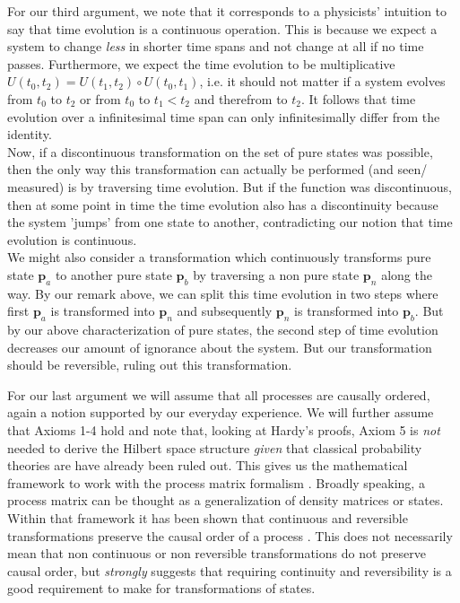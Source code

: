 \documentclass[11pt, a4paper]{article}
\begin{document}
For our third argument, we note that it corresponds to a physicists' intuition to say that time evolution is a continuous operation. This is because we expect a system to change \emph{less} in shorter time spans and not change at all if no time passes. Furthermore, we expect the time evolution to be multiplicative $U(t_0,t_2)=U(t_1,t_2)\circ U(t_0,t_1)$, i.e. it should not matter if a system evolves from $t_0$ to $t_2$ or from $t_0$ to $t_1<t_2$ and therefrom to $t_2$. It follows that time evolution over a infinitesimal time span can only infinitesimally differ from the identity.\\
Now, if a discontinuous transformation on the set of pure states was possible, then the only way this transformation can actually be performed (and seen/ measured) is by traversing time evolution. But if the function was discontinuous, then at some point in time the time evolution also has a discontinuity because the system 'jumps' from one state to another, contradicting our notion that time evolution is continuous.  \\
We might also consider a transformation which continuously transforms pure state $\mathbf p_a$ to another pure state $\mathbf p_b$ by traversing a non pure state $\mathbf p_n$ along the way. By our remark above, we can split this time evolution in two steps where first  $\mathbf p_a$ is transformed into $\mathbf p_n$ and subsequently $\mathbf p_n$ is transformed into $\mathbf p_b$. But by our above characterization of pure states, the second step of time evolution decreases our amount of ignorance about the system. But our transformation should be reversible, ruling out this transformation.\par
For our last argument we will assume that all processes are causally ordered, again a notion supported by our everyday experience. We will further assume that Axioms 1-4 hold and note that, looking at Hardy's proofs, Axiom 5 is \emph{not} needed to derive the Hilbert space structure \emph{given} that classical probability theories are have already been ruled out. This gives us the mathematical framework to work with the process matrix formalism \cite{Oreshkov_2012}. Broadly speaking, a process matrix can be thought as a generalization of density matrices or states. Within that framework it has been shown that continuous and reversible transformations preserve the causal order of a process \cite{Castro_Ruiz_2018}. This does not necessarily mean that non continuous or non reversible transformations do not preserve causal order, but \emph{strongly} suggests that requiring continuity and reversibility is a good requirement to make for transformations of states. \par
\end{document}
